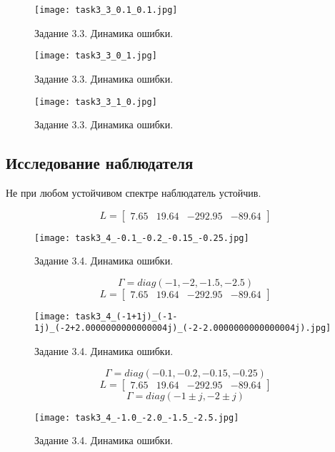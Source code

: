 \begin{figure}[]
        \centering
        \texttt{[image: task3\_3\_0.1\_0.1.jpg]}
        \caption{Задание 3.3. Динамика ошибки.}
        \label{fig:task3_3_0.1_0.1.jpg}
\end{figure}
\begin{figure}[]
        \centering
        \texttt{[image: task3\_3\_0\_1.jpg]}
        \caption{Задание 3.3. Динамика ошибки.}
        \label{fig:task3_3_0_1.jpg}
\end{figure}

\begin{figure}[]
        \centering
        \texttt{[image: task3\_3\_1\_0.jpg]}
        \caption{Задание 3.3. Динамика ошибки.}
        \label{fig:task3_3_1_0.jpg}
\end{figure}


\subsection{Исследование наблюдателя}
Не при любом устойчивом спектре наблюдатель устойчив. 


\[L = \begin{bmatrix}
    7.65 &  19.64 & -292.95 & -89.64
  \end{bmatrix}\]
  \begin{figure}[]
    \centering
    \texttt{[image: task3\_4\_-0.1\_-0.2\_-0.15\_-0.25.jpg]}
    \caption{Задание 3.4. Динамика ошибки.}
    \label{fig:task3_4_-0.1_-0.2_-0.15_-0.25.jpg}
\end{figure}

  \[\Gamma = diag(-1,-2,-1.5,-2.5)\]
  \[L = \begin{bmatrix}
    7.65 &  19.64 & -292.95 & -89.64
  \end{bmatrix}\]
  \begin{figure}[]
    \centering
    \texttt{[image: task3\_4\_(-1+1j)\_(-1-1j)\_(-2+2.0000000000000004j)\_(-2-2.0000000000000004j).jpg]}
    \caption{Задание 3.4. Динамика ошибки.}
    \label{fig:task3_4_(-1+1j)_(-1-1j)_(-2+2.0000000000000004j)_(-2-2.0000000000000004j).jpg}
\end{figure}


  \[\Gamma = diag(-0.1,-0.2,-0.15,-0.25)\]
  \[L = \begin{bmatrix}
    7.65 &  19.64 & -292.95 & -89.64
  \end{bmatrix}\]
  \[\Gamma = diag(-1\pm j, -2\pm j)\]
  \begin{figure}[]
    \centering
    \texttt{[image: task3\_4\_-1.0\_-2.0\_-1.5\_-2.5.jpg]}
    \caption{Задание 3.4. Динамика ошибки.}
    \label{fig:task3_4_-1.0_-2.0_-1.5_-2.5.jpg}
\end{figure}

